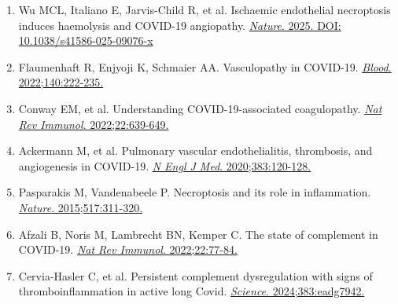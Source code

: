\documentclass[12pt,a4paper]{article}
\begin{document}
\begin{enumerate}
    \item Wu MCL, Italiano E, Jarvis-Child R, et al. Ischaemic endothelial necroptosis induces haemolysis and COVID-19 angiopathy. \href{https://doi.org/10.1038/s41586-025-09076-x}{\textit{Nature}. 2025. DOI: 10.1038/s41586-025-09076-x}

    \item Flaumenhaft R, Enjyoji K, Schmaier AA. Vasculopathy in COVID-19. \href{https://doi.org/10.1182/blood.2021014181}{\textit{Blood}. 2022;140:222-235.}

    \item Conway EM, et al. Understanding COVID-19-associated coagulopathy. \href{https://doi.org/10.1038/s41577-022-00762-9}{\textit{Nat Rev Immunol}. 2022;22:639-649.}

    \item Ackermann M, et al. Pulmonary vascular endothelialitis, thrombosis, and angiogenesis in COVID-19. \href{https://doi.org/10.1056/NEJMoa2015432}{\textit{N Engl J Med}. 2020;383:120-128.}

    \item Pasparakis M, Vandenabeele P. Necroptosis and its role in inflammation. \href{https://doi.org/10.1038/nature14191}{\textit{Nature}. 2015;517:311-320.}

    \item Afzali B, Noris M, Lambrecht BN, Kemper C. The state of complement in COVID-19. \href{https://doi.org/10.1038/s41577-021-00665-1}{\textit{Nat Rev Immunol}. 2022;22:77-84.}

    \item Cervia-Hasler C, et al. Persistent complement dysregulation with signs of thromboinflammation in active long Covid. \href{https://doi.org/10.1126/science.adg7942}{\textit{Science}. 2024;383:eadg7942.}
\end{enumerate}
\end{document}
